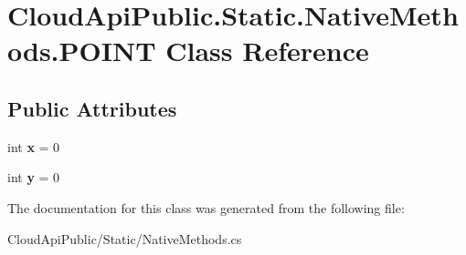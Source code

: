 \hypertarget{class_cloud_api_public_1_1_static_1_1_native_methods_1_1_p_o_i_n_t}{\section{Cloud\-Api\-Public.\-Static.\-Native\-Methods.\-P\-O\-I\-N\-T Class Reference}
\label{class_cloud_api_public_1_1_static_1_1_native_methods_1_1_p_o_i_n_t}
}
\subsection*{Public Attributes}
\begin{DoxyCompactItemize}
\item 
\hypertarget{class_cloud_api_public_1_1_static_1_1_native_methods_1_1_p_o_i_n_t_abe916cb04c6135e62f34d53942c381d9}{int {\bfseries x} = 0}\label{class_cloud_api_public_1_1_static_1_1_native_methods_1_1_p_o_i_n_t_abe916cb04c6135e62f34d53942c381d9}

\item 
\hypertarget{class_cloud_api_public_1_1_static_1_1_native_methods_1_1_p_o_i_n_t_a39f4537d32f8d410cd127a655dda925b}{int {\bfseries y} = 0}\label{class_cloud_api_public_1_1_static_1_1_native_methods_1_1_p_o_i_n_t_a39f4537d32f8d410cd127a655dda925b}

\end{DoxyCompactItemize}


The documentation for this class was generated from the following file\-:\begin{DoxyCompactItemize}
\item 
Cloud\-Api\-Public/\-Static/Native\-Methods.\-cs\end{DoxyCompactItemize}
